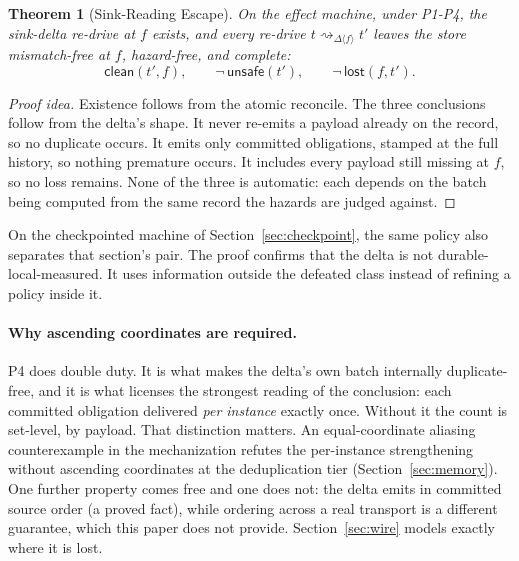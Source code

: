 \documentclass[sigplan,10pt]{acmart}
\theoremstyle{plain}
\newtheorem{theorem}{Theorem}
\theoremstyle{definition}
\newcommand{\unsafe}{\mathsf{unsafe}}
\newcommand{\lostp}{\mathsf{lost}}
\newcommand{\clean}{\mathsf{clean}}        %
\newcommand{\rdrto}[2]{\mathrel{\rightsquigarrow_{#1\langle #2\rangle}}} %
\newcommand{\sdelta}{\Delta}               %
\begin{document}
\begin{theorem}[Sink-Reading Escape]\label{thm:escape}
On the effect machine, under P1-P4, the sink-delta re-drive at $f$
exists, and every re-drive $t \rdrto{\sdelta}{f} t'$ leaves the store
mismatch-free at $f$, hazard-free, and complete:
\[
  \clean(t',f), \qquad \neg\,\unsafe(t'), \qquad \neg\,\lostp(f, t').
\]
\end{theorem}

\begin{proof}[Proof idea]
Existence follows from the atomic reconcile. The three conclusions
follow from the delta's shape. It never re-emits a payload already on the record, so no
duplicate occurs. It emits only committed obligations, stamped at the
full history, so nothing premature occurs. It includes every payload still missing
at $f$, so no loss remains. None of the three is automatic: each depends on the batch
being computed from the same record the hazards are judged against.
\end{proof}

On the checkpointed machine of Section~\ref{sec:checkpoint}, the same
policy also separates that section's pair. The proof confirms that the
delta is not durable-local-measured. It uses information outside the
defeated class instead of refining a policy inside it.

\paragraph{Why ascending coordinates are required.}
P4 does double duty. It is what makes the delta's own batch
internally duplicate-free, and it is what licenses the strongest
reading of the conclusion: each committed obligation delivered
\emph{per instance} exactly once. Without it the count is set-level, by
payload. That distinction matters. An equal-coordinate aliasing
counterexample in the mechanization refutes the per-instance strengthening without ascending coordinates at the deduplication
tier (Section~\ref{sec:memory}). One further property comes free and
one does not: the delta emits in committed source order (a proved
fact), while ordering across a real transport is a
different guarantee, which this paper does not provide.
Section~\ref{sec:wire} models exactly where it is lost.
\end{document}
